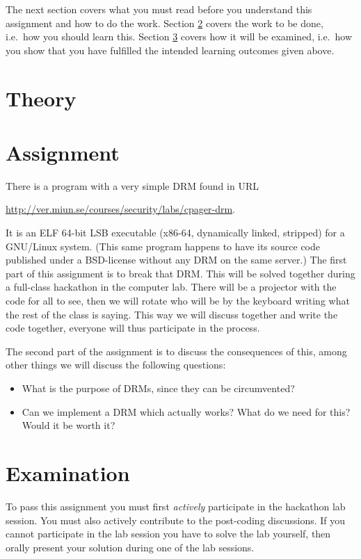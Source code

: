 The next section covers what you must read before you understand this 
assignment and how to do the work.
Section \ref{sec:tasks} covers the work to be done, i.e.~how you should learn 
this.
Section \ref{sec:exam} covers how it will be examined, i.e.~how you show that 
you have fulfilled the intended learning outcomes given above.


\section{Theory}
\label{sec:reading}



\section{Assignment}
\label{sec:tasks}
There is a program with a very simple \ac{DRM} found in URL
\begin{center}
  \url{http://ver.miun.se/courses/security/labs/cpager-drm}.
\end{center}
It is an ELF 64-bit LSB executable (x86-64, dynamically linked, stripped) for 
a GNU/Linux system.
(This same program happens to have its source code published under 
a BSD-license without any \ac{DRM} on the same server.)
The first part of this assignment is to break that \ac{DRM}.
This will be solved together during a full-class hackathon in the computer lab.
There will be a projector with the code for all to see, then we will rotate who 
will be by the keyboard writing what the rest of the class is saying.
This way we will discuss together and write the code together, everyone will 
thus participate in the process.

The second part of the assignment is to discuss the consequences of this, among 
other things we will discuss the following questions:
\begin{itemize}
  \item What is the purpose of \acp{DRM}, since they can be circumvented?
  \item Can we implement a \ac{DRM} which actually works?
    What do we need for this?
    Would it be worth it?
\end{itemize}


\section{Examination}
\label{sec:exam}
To pass this assignment you must first \emph{actively} participate in the 
hackathon lab session.
You must also actively contribute to the post-coding discussions.
If you cannot participate in the lab session you have to solve the lab 
yourself, then orally present your solution during one of the lab sessions.


